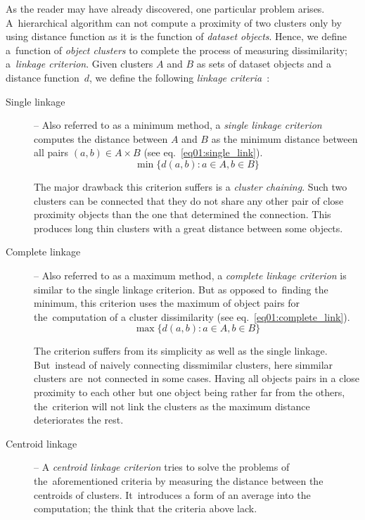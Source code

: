 As the reader may have already discovered, one particular problem arises. A~hierarchical algorithm can not compute a proximity of two clusters only by using distance function as it is the function of \emph{dataset objects}. Hence, we define a~function of \emph{object clusters} to complete the process of measuring dissimilarity; a~\emph{linkage criterion}. Given clusters $A$ and $B$ as sets of dataset objects and a distance function~$d$, we define the following \emph{linkage criteria}~\cite{yim2015hierarchical}:

\begin{description}
	\item[Single linkage] -- Also referred to as a minimum method, a \emph{single linkage criterion} computes the distance between $A$ and $B$ as the minimum distance between all pairs $(a,b) \in A\times B$ (see eq.~\ref{eq01:single_link}).
	\begin{equation}\label{eq01:single_link}
	\min\{d(a,b) : a \in A, b \in B\}
	\end{equation}
	
	The major drawback this criterion suffers is a \emph{cluster chaining}. Such two clusters can be connected that they do not share any other pair of close proximity objects than the one that determined the connection. This produces long thin clusters with a great distance between some objects.
	
	\item[Complete linkage] -- Also referred to as a maximum method, a \emph{complete linkage criterion} is similar to the single linkage criterion. But as opposed to~finding the minimum, this criterion uses the maximum of object pairs for the~computation of a cluster dissimilarity (see eq.~\ref{eq01:complete_link}). 
	\begin{equation}\label{eq01:complete_link}
	\max\{d(a,b) : a \in A, b \in B\}
	\end{equation}
	
	The criterion suffers from its simplicity as well as the single linkage. But~instead of naively connecting dissmimilar clusters, here simmilar clusters are~not connected in some cases. Having all objects pairs in a close proximity to each other but one object being rather far from the others, the~criterion will not link the clusters as the maximum distance deteriorates the rest.
	
	\item[Centroid linkage] -- A \emph{centroid linkage criterion} tries to solve the problems of the~aforementioned criteria by measuring the distance between the centroids of clusters. It~introduces a form of an average into the computation; the think that the criteria above lack.
\end{description}

